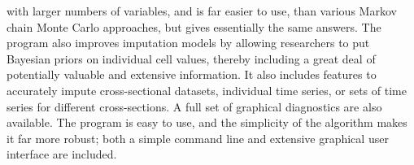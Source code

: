with larger numbers of variables, and is far easier to use, than various Markov chain Monte Carlo approaches,
but gives essentially the same answers. The program also improves imputation models by allowing researchers to put 
Bayesian priors on individual cell values, thereby including a great deal of potentially valuable and extensive 
information. It also includes features to accurately impute cross-sectional datasets, individual time series, or sets of time series for different cross-sections. A full set of graphical diagnostics are also available. The program is easy to use, and the simplicity of the algorithm makes it far more robust; both a simple command line and extensive graphical user interface are included.



